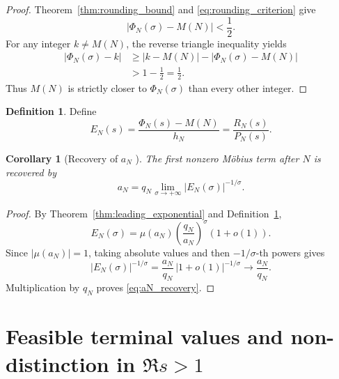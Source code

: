 \documentclass[11pt]{amsart}
\numberwithin{equation}{section}
\theoremstyle{plain}
\newtheorem{corollary}[theorem]{Corollary}
\theoremstyle{definition}
\newtheorem{definition}[theorem]{Definition}
\theoremstyle{remark}
\newcommand{\1}{\mathbf{1}}
\begin{document}
\begin{proof}
Theorem~\ref{thm:rounding_bound} and
\eqref{eq:rounding_criterion} give
\begin{equation}
|\Phi_N(\sigma)-M(N)|<\frac12.
\label{eq:rounding_criterion_proof_ball}
\end{equation}
For any integer \(k\neq M(N)\), the reverse triangle inequality yields
\begin{align}
|\Phi_N(\sigma)-k|
&\geq
|k-M(N)|-|\Phi_N(\sigma)-M(N)|
\label{eq:rounding_reverse_triangle_one}
\\
&>
1-\frac12
=
\frac12.
\label{eq:rounding_reverse_triangle_two}
\end{align}
Thus \(M(N)\) is strictly closer to \(\Phi_N(\sigma)\) than every other
integer.
\end{proof}

\begin{definition}
\label{def:EN}
Define
\begin{equation}
E_N(s)
=
\frac{\Phi_N(s)-M(N)}{h_N}
=
\frac{R_N(s)}{P_N(s)}.
\label{eq:EN_definition}
\end{equation}
\end{definition}


\begin{corollary}[Recovery of \(a_N\) {}]
\label{cor:aN_recovery}
The first nonzero Möbius term after \(N\) is recovered by
\begin{equation}
\boxed{
a_N
=
q_N
\lim_{\sigma\to+\infty}
|E_N(\sigma)|^{-1/\sigma}.
}
\label{eq:aN_recovery}
\end{equation}
\end{corollary}

\begin{proof}
By Theorem~\ref{thm:leading_exponential} and
Definition~\ref{def:EN},
\begin{equation}
E_N(\sigma)
=
\mu(a_N)
\left(\frac{q_N}{a_N}\right)^\sigma
(1+o(1)).
\label{eq:aN_recovery_asymptotic}
\end{equation}
Since \(|\mu(a_N)|=1\), taking absolute values and then
\(-1/\sigma\)-th powers gives
\begin{equation}
|E_N(\sigma)|^{-1/\sigma}
=
\frac{a_N}{q_N}
\,|1+o(1)|^{-1/\sigma}
\longrightarrow
\frac{a_N}{q_N}.
\label{eq:aN_recovery_root_limit}
\end{equation}
Multiplication by \(q_N\) proves \eqref{eq:aN_recovery}.
\end{proof}

\section{Feasible terminal values and non-distinction in \texorpdfstring{\(\Re s>1\)}{Re(s)>1}}
\label{sec:feasible_values}
\end{document}
